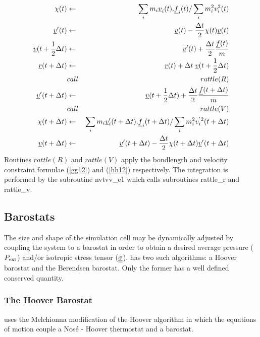 \begin{eqnarray}
\chi(t) &\leftarrow& 
 \sum_i m_i \mbox{$\underline{v}$}_i(t).\mbox{$\underline{f}$}_i(t)/\sum_i m_i^2 v_i^2(t) \nonumber \\
\mbox{$\underline{v}$}'(t)&\leftarrow& \mbox{$\underline{v}$}(t) -
 {\Delta t \over 2}\chi(t)\mbox{$\underline{v}$}(t)\nonumber\\
\mbox{$\underline{v}$}(t + {1\over 2} \Delta t)&\leftarrow& \mbox{$\underline{v}$}'(t)
+ {\Delta t \over 2} {\mbox{$\underline{f}$}(t)\over m} \nonumber \\
\mbox{$\underline{r}$}(t+\Delta t) &\leftarrow& \mbox{$\underline{r}$}(t) + \Delta t \;
\mbox{$\underline{v}$}(t+{1\over 2}\Delta t)\nonumber \\
&call&rattle(R) \nonumber \\
\mbox{$\underline{v}$}'(t + \Delta t)&\leftarrow& \mbox{$\underline{v}$}(t + {1 \over 2}\Delta t) +
 {\Delta t \over 2} {\mbox{$\underline{f}$}(t + \Delta t)\over m} \nonumber \\
&call&rattle(V) \nonumber \\
\chi(t+\Delta t) &\leftarrow& 
 \sum_i m_i \mbox{$\underline{v}$}'_i(t+\Delta t).\mbox{$\underline{f}$}_i(t+\Delta t)/\sum_i m_i^2
 v_i^{'2}(t+\Delta t) \nonumber \\
\mbox{$\underline{v}$}(t + \Delta t)&\leftarrow& \mbox{$\underline{v}$}'(t + \Delta t) -
 {\Delta t \over 2}\chi(t+\Delta t)\mbox{$\underline{v}$}'(t+\Delta t)
\end{eqnarray}
Routines $rattle(R)$ and $rattle(V)$ apply the bondlength and velocity
constraint formulae (\ref{gg12}) and (\ref{hh12}) respectively.  The
integration is performed by the subroutine {\sc nvtvv\_e1} which calls
subroutines {\sc rattle\_r} and {\sc rattle\_v}.

\subsection{Barostats}

The size and shape of the simulation cell may be dynamically adjusted
by coupling the system to a barostat in order to obtain a desired
average pressure ($P_{\rm ext}$) and/or isotropic stress
tensor ($\mbox{$\underline{\underline{\bf \sigma}}$}$).
\D{} has two such algorithms: a Hoover barostat and the Berendsen 
barostat. Only the former has a well defined conserved quantity.

\subsubsection{The Hoover Barostat}

\D{} uses the Melchionna modification of the Hoover algorithm 
\cite{melchionna-93a} in which the equations of motion couple
a Nos\'e - Hoover thermostat and a barostat.

